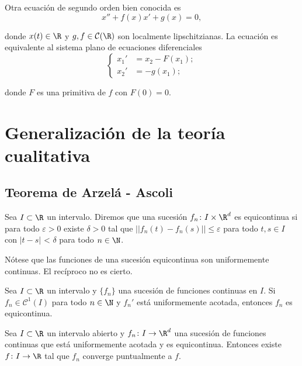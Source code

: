 \documentclass{article}
\newcommand{\importsection}[1]{}           %
\begin{document}
\begin{ex}
  Otra ecuación de segundo orden bien conocida es
  \begin{equation}
    \label{eq:lienard}
    x'' + f(x)x' + g(x) = 0,
  \end{equation}

  donde $x(t) \in \R$ y $g,f \in \mathcal{C}(\R)$ son localmente lipschitzianas. La ecuación es
  equivalente al sistema plano de ecuaciones diferenciales
  \begin{equation}
    \label{eq:lienard:sis}
    \begin{cases}
      x_1' & = x_2 - F(x_1); \\
      x_2' & = - g(x_1);
    \end{cases}
  \end{equation}

  donde $F$ es una primitiva de $f$ con $F(0) = 0$.
\end{ex}

\newpage
\importsection{solucion_general.tex}

\newpage
\importsection{estabilidad.tex}


\section{Generalización de la teoría cualitativa}

\subsection{Teorema de Arzelá - Ascoli}

\begin{definition}
  Sea $I \subset \R$ un intervalo. Diremos que una sucesión $f_n \colon I \times \R^d$ es
  equicontinua si para todo $\varepsilon > 0$ existe $\delta > 0$ tal que
  $||f_n(t) - f_n(s)|| \le \varepsilon$ para todo $t,s \in I$ con $|t-s|$ < $\delta$ para todo
  $n \in \N$.
\end{definition}

Nótese que las funciones de una sucesión equicontinua son uniformemente continuas. El recíproco no es
cierto.

\begin{lemma}
  Sea $I \subset \R$ un intervalo y $\{f_n\}$ una sucesión de funciones continuas en $I$. Si
  $f_n \in \mathcal{C}^1(I)$ para todo $n \in \N$ y $f_n'$ está uniformemente acotada, entonces
  $f_n$ es equicontinua.
\end{lemma}

\begin{theorem}
  \label{thm:arzela-ascoli}
  Sea $I \subset \R$ un intervalo abierto y $ f_n \colon I \to \R^d$ una sucesión de funciones
  continuas que está uniformemente acotada y es equicontinua. Entonces existe $f \colon I \to \R$
  tal que $f_n$ converge puntualmente a $f$.
\end{theorem}
\end{document}
